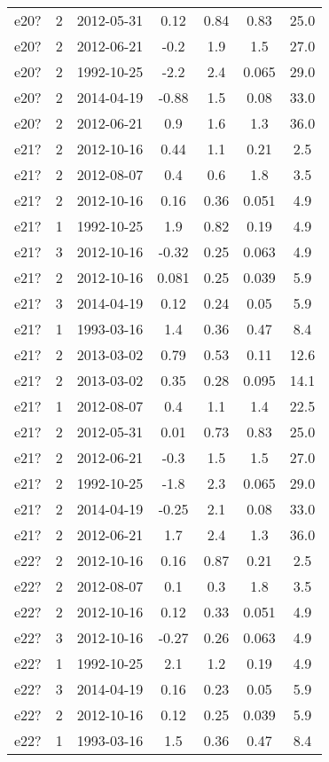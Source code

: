 \begin{table*}[htp]
\begin{tabular}{ccccccc}
e20? & 2 & 2012-05-31 & 0.12 & 0.84 & 0.83 & 25.0 \\
e20? & 2 & 2012-06-21 & -0.2 & 1.9 & 1.5 & 27.0 \\
e20? & 2 & 1992-10-25 & -2.2 & 2.4 & 0.065 & 29.0 \\
e20? & 2 & 2014-04-19 & -0.88 & 1.5 & 0.08 & 33.0 \\
e20? & 2 & 2012-06-21 & 0.9 & 1.6 & 1.3 & 36.0 \\
e21? & 2 & 2012-10-16 & 0.44 & 1.1 & 0.21 & 2.5 \\
e21? & 2 & 2012-08-07 & 0.4 & 0.6 & 1.8 & 3.5 \\
e21? & 2 & 2012-10-16 & 0.16 & 0.36 & 0.051 & 4.9 \\
e21? & 1 & 1992-10-25 & 1.9 & 0.82 & 0.19 & 4.9 \\
e21? & 3 & 2012-10-16 & -0.32 & 0.25 & 0.063 & 4.9 \\
e21? & 2 & 2012-10-16 & 0.081 & 0.25 & 0.039 & 5.9 \\
e21? & 3 & 2014-04-19 & 0.12 & 0.24 & 0.05 & 5.9 \\
e21? & 1 & 1993-03-16 & 1.4 & 0.36 & 0.47 & 8.4 \\
e21? & 2 & 2013-03-02 & 0.79 & 0.53 & 0.11 & 12.6 \\
e21? & 2 & 2013-03-02 & 0.35 & 0.28 & 0.095 & 14.1 \\
e21? & 1 & 2012-08-07 & 0.4 & 1.1 & 1.4 & 22.5 \\
e21? & 2 & 2012-05-31 & 0.01 & 0.73 & 0.83 & 25.0 \\
e21? & 2 & 2012-06-21 & -0.3 & 1.5 & 1.5 & 27.0 \\
e21? & 2 & 1992-10-25 & -1.8 & 2.3 & 0.065 & 29.0 \\
e21? & 2 & 2014-04-19 & -0.25 & 2.1 & 0.08 & 33.0 \\
e21? & 2 & 2012-06-21 & 1.7 & 2.4 & 1.3 & 36.0 \\
e22? & 2 & 2012-10-16 & 0.16 & 0.87 & 0.21 & 2.5 \\
e22? & 2 & 2012-08-07 & 0.1 & 0.3 & 1.8 & 3.5 \\
e22? & 2 & 2012-10-16 & 0.12 & 0.33 & 0.051 & 4.9 \\
e22? & 3 & 2012-10-16 & -0.27 & 0.26 & 0.063 & 4.9 \\
e22? & 1 & 1992-10-25 & 2.1 & 1.2 & 0.19 & 4.9 \\
e22? & 3 & 2014-04-19 & 0.16 & 0.23 & 0.05 & 5.9 \\
e22? & 2 & 2012-10-16 & 0.12 & 0.25 & 0.039 & 5.9 \\
e22? & 1 & 1993-03-16 & 1.5 & 0.36 & 0.47 & 8.4 \\

\end{tabular}
\end{table*}

